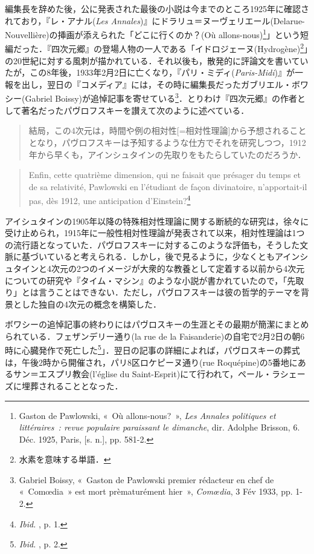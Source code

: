 編集長を辞めた後，公に発表された最後の小説は今までのところ1925年に確認されており，『レ・アナル(\emph{Les Annales})』にドラリュ＝ヌーヴェリエール(Delarue-Nouvellière)の挿画が添えられた「どこに行くのか？(Où allons-nous)\footnote{Gaston de Pawlowski, «~Où allons-nous?~», \emph{Les Annales politiques et littéraires~: revue populaire paraissant le dimanche}, dir. Adolphe Brisson, 6. Déc. 1925, Paris, [s. n.], pp. 581-2.}」という短編だった．『四次元郷』の登場人物の一人である「イドロジェーヌ(Hydrogène)\footnote{水素を意味する単語．}」の20世紀に対する風刺が描かれている．それ以後も，散発的に評論文を書いていたが，この8年後，1933年2月2日に亡くなり，『パリ・ミディ(\emph{Paris-Midi})』が一報を出し，翌日の『コメディア』には，その時に編集長だったガブリエル・ボワシー(Gabriel Boissy)が追悼記事を寄せている\footnote{Gabriel Boissy, «~Gaston de Pawlowski premier rédacteur en chef de «~Comœdia~» est mort prèmaturément hier~», \emph{Comœdia}, 3 Fév 1933, pp. 1-2.}．とりわけ『四次元郷』の作者として著名だったパヴロフスキーを讃えて次のように述べている．

\begin{quote}
 結局，この4次元は，時間や例の相対性[=相対性理論]から予想されることとなり，パヴロフスキーは予知するような仕方でそれを研究しつつ，1912年から早くも，アインシュタインの先取りをもたらしていたのだろうか．
\end{quote}
\begin{quote}
 Enfin, cette quatrième dimension, qui ne faisait que présager du temps et de sa relativité, Pawlowski en l'étudiant de façon divinatoire, n'apportait-il pas, dès 1912, une anticipation d'Einstein?\footnote{\emph{Ibid. }, p. 1.}
\end{quote}

アイシュタインの1905年以降の特殊相対性理論に関する断続的な研究は，徐々に受け止められ，1915年に一般性相対性理論が発表されて以来，相対性理論は1つの流行語となっていた．パヴロフスキーに対するこのような評価も，そうした文脈に基づいていると考えられる．しかし，後で見るように，少なくともアインシュタインと4次元の2つのイメージが大衆的な教養として定着する以前から4次元についての研究や『タイム・マシン』のような小説が書かれていたので，「先取り」とは言うことはできない．ただし，パヴロフスキーは彼の哲学的テーマを背景とした独自の4次元の概念を構築した．

ボワシーの追悼記事の終わりにはパヴロスキーの生涯とその最期が簡潔にまとめられている．フェザンデリー通り(la rue de la Faisanderie)の自宅で2月2日の朝6時に心臓発作で死亡した\footnote{\emph{Ibid. }, p. 2.}」．翌日の記事の詳細によれば，パヴロスキーの葬式は，午後2時から開催され，パリ8区ロケピーヌ通り(rue Roquépine)の5番地にあるサン＝エスプリ教会(l'église du Saint-Esprit)にて行われて，ペール・ラシェーズに埋葬されることとなった．

